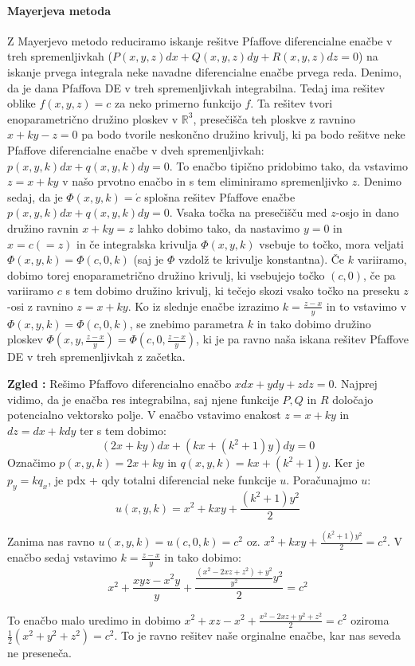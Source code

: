 \documentclass[a4paper, 10pt]{article}
\newcounter{zgledcount}
\newenvironment{zgled}{\begin{flushleft}\refstepcounter{zgledcount}\textbf{Zgled \arabic{zgledcount}:}}{\hfill\end{flushleft}}
\newcommand{\mth}[1]{\ensuremath{\mathbb{#1}}}
\newcommand{\R}{\mth{R}}
\begin{document}
					\paragraph{Mayerjeva metoda}
						Z Mayerjevo metodo reduciramo iskanje rešitve Pfaffove diferencialne enačbe v treh spremenljivkah ($P(x, y, z)dx + Q(x, y, z)dy + R(x, y, z)dz = 0$) na iskanje prvega integrala neke navadne diferencialne enačbe prvega reda. Denimo, da je dana Pfaffova DE v treh spremenljivkah integrabilna. Tedaj ima rešitev oblike $f(x, y, z) = c$ za neko primerno funkcijo $f$. Ta rešitev tvori enoparametrično družino ploskev v $\R^3$, presečišča teh ploskve z ravnino $x + ky - z = 0$ pa bodo tvorile neskončno družino krivulj, ki pa bodo rešitve neke Pfaffove diferencialne enačbe v dveh spremenljivkah: $p(x, y, k)dx + q(x, y, k)dy = 0$. To enačbo tipično pridobimo tako, da vstavimo $z = x + ky$ v našo prvotno enačbo in s tem eliminiramo spremenljivko $z$. Denimo sedaj, da je $\Phi(x, y, k) = \acute{c}$ splošna rešitev Pfaffove enačbe $p(x, y, k)dx + q(x, y, k)dy = 0$. Vsaka točka na presečišču med $z$-osjo in dano družino ravnin $x + ky = z$ lahko dobimo tako, da nastavimo $y = 0$ in $x = c (=z)$ in če integralska krivulja $\Phi(x, y, k)$ vsebuje to točko, mora veljati $\Phi(x, y, k) = \Phi(c, 0, k)$ (saj je $\Phi$ vzdolž te krivulje konstantna). Če $k$ variiramo, dobimo torej enoparametrično družino krivulj, ki vsebujejo točko $(c, 0)$, če pa variiramo $c$ s tem dobimo družino krivulj, ki tečejo skozi vsako točko na preseku $z$-osi z ravnino $z = x + ky$. Ko iz slednje enačbe izrazimo $k = \frac{z - x}{y}$ in to vstavimo v $\Phi(x, y, k) = \Phi(c, 0, k)$, se znebimo parametra $k$ in tako dobimo družino ploskev $\Phi(x, y, \frac{z - x}{y}) = \Phi(c, 0, \frac{z - x}{y})$, ki je pa ravno naša iskana rešitev Pfaffove DE v treh spremenljivkah z začetka.
						
						\begin{zgled}
							Rešimo Pfaffovo diferencialno enačbo $xdx + ydy + zdz = 0$. Najprej vidimo, da je enačba res integrabilna, saj njene funkcije $P, Q$ in $R$ določajo potencialno vektorsko polje. V enačbo vstavimo enakost $z = x + ky$ in $dz = dx + kdy$ ter s tem dobimo: $$(2x+ky)dx + (kx+(k^2+1)y)dy = 0$$ Označimo $p(x, y, k) = 2x+ky$ in $q(x, y, k)=kx + (k^2+1)y$. Ker je $p_y = k q_x$, je pdx + qdy totalni diferencial neke funkcije $u$. Poračunajmo $u$: $$u(x, y, k)= x^2 + kxy + \frac{(k^2+1)y^2}{2} $$
							
							Zanima nas ravno $u(x, y, k) = u(c, 0, k) = c^2$ oz. $x^2 + kxy + \frac{(k^2+1)y^2}{2} = c^2$. V enačbo sedaj vstavimo $k = \frac{z - x}{y}$ in tako dobimo: $$ x^2 + \frac{xyz - x^2y}{y} + \frac{\frac{(x^2 - 2xz + z^2) + y^2}{y^2}y^2}{2} = c^2$$
							
							To enačbo malo uredimo in dobimo $x^2 + xz - x^2 + \frac{x^2 - 2xz + y^2 + z^2}{2} = c^2$ oziroma $\frac{1}{2}(x^2 + y^2 + z^2) = c^2$. To je ravno rešitev naše orginalne enačbe, kar nas seveda ne preseneča.
								
						\end{zgled}
						
\end{document}
